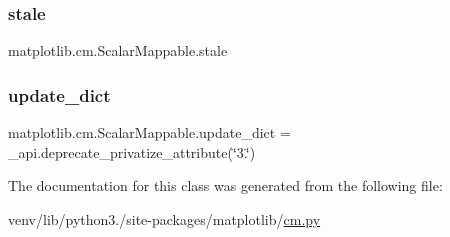 \subsubsection{\texorpdfstring{stale}{stale}}
{\footnotesize\ttfamily matplotlib.\+cm.\+Scalar\+Mappable.\+stale}

\mbox{\label{classmatplotlib_1_1cm_1_1ScalarMappable_acf44aea1bf0a92af3091c51f47bf64fd}} 
\subsubsection{\texorpdfstring{update\+\_\+dict}{update\_dict}}
{\footnotesize\ttfamily matplotlib.\+cm.\+Scalar\+Mappable.\+update\+\_\+dict = \+\_\+api.\+deprecate\+\_\+privatize\+\_\+attribute(\char`\"{}3.\char`\"{})\hspace{0.3cm}{\ttfamily [static]}}



The documentation for this class was generated from the following file\+:\begin{DoxyCompactItemize}
\item 
venv/lib/python3./site-\/packages/matplotlib/\hyperlink{cm_8py}{cm.\+py}\end{DoxyCompactItemize}
